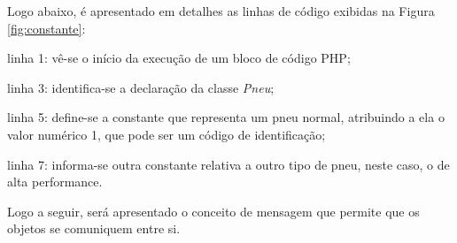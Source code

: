 \FloatBarrier 	%

Logo abaixo, é apresentado em detalhes as linhas de código exibidas na Figura
\ref{fig:constante}:

\begin{alineas}
    \item linha 1: vê-se o início da execução de um bloco de código PHP;
    \item linha 3: identifica-se a declaração da classe \textit{Pneu};
    \item linha 5: define-se a constante que representa um pneu normal,
    atribuindo a ela o valor numérico 1, que pode ser um código de
    identificação;
    \item linha 7: informa-se outra constante relativa a outro tipo de pneu,
    neste caso, o de alta performance.
\end{alineas}

Logo a seguir, será apresentado o conceito de mensagem que permite que os
objetos se comuniquem entre si.
